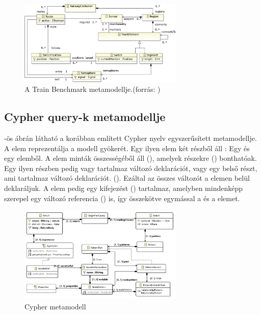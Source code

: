 \begin{figure}
	\centering
	\includegraphics[width=0.7\textwidth]{figures/trainbenchmarkfig2}
	\caption{A Train Benchmark metamodellje.(forrás: \cite{szarnyas2018train})}
	\label{fig:trainbenchmarkmetamodell}
\end{figure}

\subsection{Cypher query-k metamodellje}

 -ös ábrán látható a korábban említett Cypher nyelv egyszerűsített metamodellje.
A  elem reprezentálja a modell gyökerét. Egy ilyen elem két részből áll : Egy  
és egy  elemből. A  elem minták összességéből áll (), amelyek 
részekre () bonthatóak. Egy ilyen részben pedig vagy tartalmaz változó deklarációt,
vagy egy belső részt, ami tartalmaz változó deklarációt. ().
Ezáltal az összes változót a  elemen belül deklaráljuk. A  elem  pedig egy
kifejezést () tartalmaz, amelyben mindenképp szerepel egy változó referencia
 () is, így összekötve egymással a  és a  elemet. 

\begin{figure}
	\centering
	\includegraphics[width=0.7\textwidth]{figures/openCypherClassDiagram}
	\caption{Cypher metamodell}
	\label{fig:cyphermetamodell}
\end{figure}


